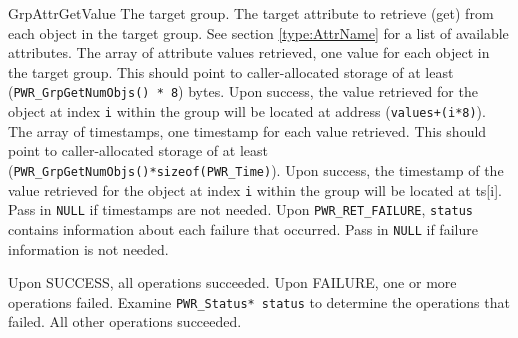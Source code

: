 \begin{prototype}{GrpAttrGetValue}
		{\pInput}{The target group.}
		{\pInput}{The target attribute to retrieve (get) from each object in the target group. See section \ref{type:AttrName} for a list of available attributes.}
		{\pOutput}{The array of attribute values retrieved, one value for each object in the target group. This should point to caller-allocated storage of at least (\texttt{PWR_GrpGetNumObjs() * 8}) bytes. Upon success, the value retrieved for the object at index \texttt{i} within the group will be located at address (\texttt{values+(i*8)}).}
		{\pOutput}{The array of timestamps, one timestamp for each value retrieved. This should point to caller-allocated storage of at least (\texttt{PWR_GrpGetNumObjs()*sizeof(PWR_Time)}). Upon success, the timestamp of the value retrieved for the object at index \texttt{i} within the group will be located at ts[i]. Pass in \texttt{NULL} if timestamps are not needed.}
		{\pOutput}{Upon \texttt{PWR_RET_FAILURE}, \texttt{status} contains information about each failure that occurred. Pass in \texttt{NULL} if failure information is not needed.}

	 	{Upon SUCCESS, all operations succeeded.}
	 	{Upon FAILURE, one or more operations failed. Examine \texttt{PWR_Status* status} to determine the operations that failed. All other operations succeeded.}
\end{prototype}
